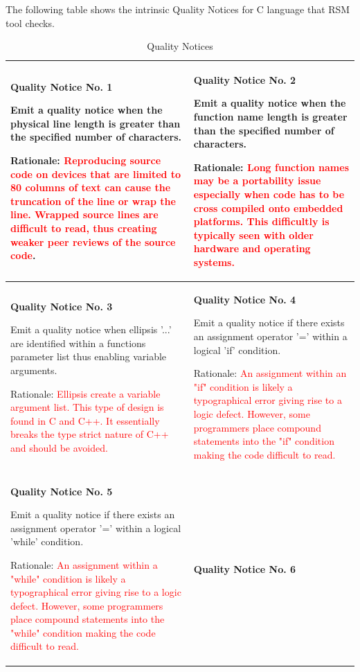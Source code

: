 The following table shows the intrinsic Quality Notices for C language that RSM tool checks.

{\footnotesize\sffamily\centering
  \begin{longtable}{||p{}|p{}||}
  \caption{Quality Notices}\\
    \hline\hline
    \hline\hline
    \endhead
    \hline\hline
    \endfoot
    \textbf{Quality Notice No. 1}

Emit a quality notice when the physical line length is greater than the specified number of characters.

Rationale:  \textcolor{red}{Reproducing source code on devices that are limited to 80 columns of text can cause the truncation of the line or wrap the line.  Wrapped source lines are difficult to read, thus creating weaker peer reviews of the source code}.
& \textbf{Quality Notice No. 2}

Emit a quality notice when the function name length is greater than the specified number of characters.  

Rationale:  \textcolor{red}{Long function names may be a portability issue especially when code has to be cross compiled onto embedded platforms.  This difficultly is typically seen with older hardware and operating systems.}
    \\
    \hline \textbf{Quality Notice No. 3}
    
Emit a quality notice when ellipsis '...' are identified within a functions parameter list thus enabling variable arguments.  

Rationale:  \textcolor{red}{Ellipsis create a variable argument list.  This type of design is found in C and C++.  It essentially breaks the type strict nature of C++ and should be avoided.}
 & \textbf{Quality Notice No. 4}
 
Emit a quality notice if there exists an assignment
operator '=' within a logical 'if' condition.

Rationale:  \textcolor{red}{An assignment within an "if" condition is likely a typographical error giving rise to a logic defect.  However, some programmers place compound statements into the "if" condition making the code difficult to read.}
    \\
    \hline \textbf{Quality Notice No. 5}
    
Emit a quality notice if there exists an assignment
operator '=' within a logical 'while' condition.

Rationale:  \textcolor{red}{An assignment within a "while" condition is likely a typographical error giving rise to a logic defect.  However, some programmers place compound statements into the "while" condition making the code difficult to read.}
 & \textbf{Quality Notice No. 6}
 

\end{longtable}}
